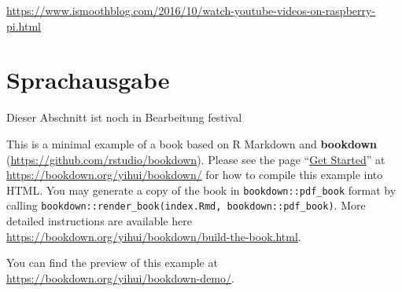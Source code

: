 \documentclass[]{book}
\begin{document}
\url{https://www.ismoothblog.com/2016/10/watch-youtube-videos-on-raspberry-pi.html}

\hypertarget{sprachausgabe}{%
\chapter{Sprachausgabe}\label{sprachausgabe}}

Dieser Abschnitt ist noch in Bearbeitung
festival

This is a minimal example of a book based on R Markdown and \textbf{bookdown} (\url{https://github.com/rstudio/bookdown}). Please see the page ``\href{https://bookdown.org/yihui/bookdown/get-started.html}{Get Started}'' at \url{https://bookdown.org/yihui/bookdown/} for how to compile this example into HTML. You may generate a copy of the book in \texttt{bookdown::pdf\_book} format by calling \texttt{bookdown::render\_book(\textquotesingle{}index.Rmd\textquotesingle{},\ \textquotesingle{}bookdown::pdf\_book\textquotesingle{})}. More detailed instructions are available here \url{https://bookdown.org/yihui/bookdown/build-the-book.html}.

You can find the preview of this example at \url{https://bookdown.org/yihui/bookdown-demo/}.


\end{document}
